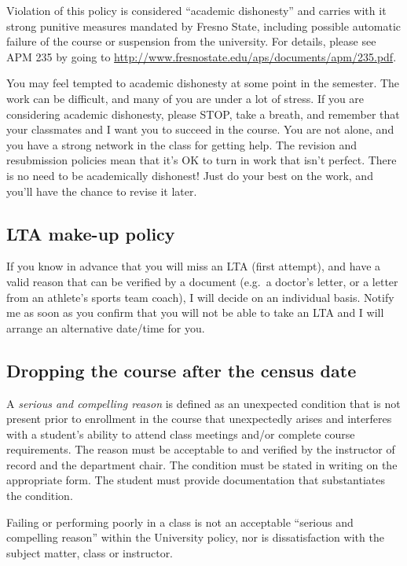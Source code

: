 Violation of this policy is considered ``academic dishonesty'' and
carries with it strong punitive measures mandated by Fresno State,
including possible automatic failure of the course or suspension from
the university. For details, please see APM 235 by going to
\url{http://www.fresnostate.edu/aps/documents/apm/235.pdf}.

You may feel tempted to academic dishonesty at some point in the
semester. The work can be difficult, and many of you are under a lot of
stress. If you are considering academic dishonesty, please STOP, take a
breath, and remember that your classmates and I want you to succeed in
the course. You are not alone, and you have a strong network in the
class for getting help. The revision and resubmission policies mean that
it's OK to turn in work that isn't perfect. There is no need to be
academically dishonest! Just do your best on the work, and you'll have
the chance to revise it later.

\hypertarget{lta-make-up-policy}{%
\subsection{LTA make-up policy}\label{lta-make-up-policy}}

If you know in advance that you will miss an LTA (first attempt), and
have a valid reason that can be verified by a document (e.g.~a doctor's
letter, or a letter from an athlete's sports team coach), I will decide
on an individual basis. Notify me as soon as you confirm that you will
not be able to take an LTA and I will arrange an alternative date/time
for you.

\hypertarget{dropping-the-course-after-the-census-date}{%
\subsection{Dropping the course after the census
date}\label{dropping-the-course-after-the-census-date}}

A \emph{serious and compelling reason} is defined as an unexpected
condition that is not present prior to enrollment in the course that
unexpectedly arises and interferes with a student's ability to attend
class meetings and/or complete course requirements. The reason must be
acceptable to and verified by the instructor of record and the
department chair. The condition must be stated in writing on the
appropriate form. The student must provide documentation that
substantiates the condition.

Failing or performing poorly in a class is not an acceptable ``serious
and compelling reason'' within the University policy, nor is
dissatisfaction with the subject matter, class or instructor.

